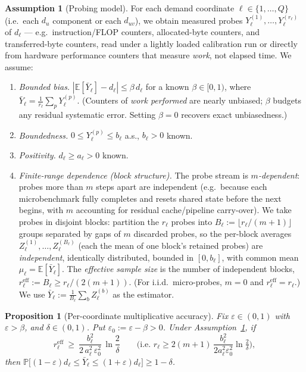 \documentclass{amsart}
\newtheorem{proposition}{Proposition}
\theoremstyle{definition}
\newtheorem{assumption}{Assumption}
\newcommand{\E}{\mathbb{E}}
\renewcommand{\Pr}{\mathbb{P}}
\begin{document}
\begin{assumption}[Probing model]\label{ass:probe}
For each demand coordinate $\ell\in\{1,\dots,Q\}$ (i.e.\ each $d_u$ component or
each $d_{uv}$), we obtain measured probes $Y^{(1)}_\ell,\dots,Y^{(r_\ell)}_\ell$
of $d_\ell$ — e.g.\ instruction/FLOP counters, allocated-byte counters, and
transferred-byte counters, read under a lightly loaded calibration run or
directly from hardware performance counters that measure \emph{work}, not
elapsed time. We assume:
\begin{enumerate}
\item[(M1$'$)] \emph{Bounded bias.} $|\E[\bar Y_\ell]-d_\ell|\le\beta\,d_\ell$
for a known $\beta\in[0,1)$, where $\bar Y_\ell=\frac1{r_\ell}\sum_p Y^{(p)}_\ell$.
(Counters of \emph{work performed} are nearly unbiased; $\beta$ budgets any
residual systematic error. Setting $\beta=0$ recovers exact unbiasedness.)
\item[(M2)] \emph{Boundedness.} $0\le Y^{(p)}_\ell\le b_\ell$ a.s., $b_\ell>0$ known.
\item[(M3)] \emph{Positivity.} $d_\ell\ge a_\ell>0$ known.
\item[(M4)] \emph{Finite-range dependence (block structure).} The probe stream is
\emph{$m$-dependent}: probes more than $m$ steps apart are independent (e.g.\
because each microbenchmark fully completes and resets shared state before the
next begins, with $m$ accounting for residual cache/pipeline carry-over). We
take probes in disjoint blocks: partition the $r_\ell$ probes into
$B_\ell:=\lfloor r_\ell/(m+1)\rfloor$ groups separated by gaps of $m$ discarded
probes, so the per-block averages
$Z^{(1)}_\ell,\dots,Z^{(B_\ell)}_\ell$ (each the mean of one block's retained
probes) are \emph{independent}, identically distributed, bounded in $[0,b_\ell]$,
with common mean $\mu_\ell=\E[\bar Y_\ell]$. The \emph{effective sample size} is
the number of independent blocks, $r_\ell^{\mathrm{eff}}:=B_\ell\ge
r_\ell/(2(m+1))$. (For i.i.d.\ micro-probes, $m=0$ and
$r_\ell^{\mathrm{eff}}=r_\ell$.) We use $\bar Y_\ell:=\frac1{B_\ell}\sum_{b}Z^{(b)}_\ell$
as the estimator.
\end{enumerate}
\end{assumption}

\begin{proposition}[Per-coordinate multiplicative accuracy]\label{prop:samples}
Fix $\varepsilon\in(0,1)$ with $\varepsilon>\beta$, and $\delta\in(0,1)$. Put
$\varepsilon_0:=\varepsilon-\beta>0$. Under
Assumption~\ref{ass:probe}, if
\begin{equation}\label{eq:rbound}
r_\ell^{\mathrm{eff}}\ \ge\ \frac{b_\ell^2}{2\,a_\ell^2\,\varepsilon_0^2}\,
\ln\frac2\delta
\qquad\Big(\text{i.e. } r_\ell\ge 2(m+1)\,\frac{b_\ell^2}{2a_\ell^2\varepsilon_0^2}\ln\tfrac2\delta\Big),
\end{equation}
then $\Pr\big[(1-\varepsilon)d_\ell\le \bar Y_\ell\le(1+\varepsilon)d_\ell\big]\ge1-\delta$.
\end{proposition}
\end{document}
